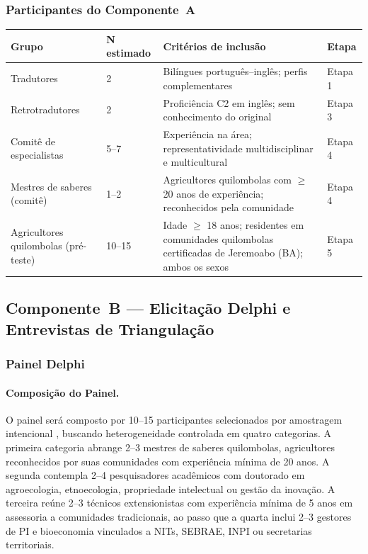 \documentclass[12pt,a4paper,brazil]{article}
\begin{document}
\subsubsection{Participantes do Componente~A}

\begin{longtable}{p{4cm}p{2.5cm}p{5.5cm}p{2cm}}
\toprule
\textbf{Grupo} & \textbf{N estimado} & \textbf{Critérios de inclusão} & \textbf{Etapa} \\
\midrule
\endhead
Tradutores & 2 & Bilíngues português--inglês; perfis complementares & Etapa 1 \\
Retrotradutores & 2 & Proficiência C2 em inglês; sem conhecimento do original & Etapa 3 \\
Comitê de especialistas & 5--7 & Experiência na área; representatividade multidisciplinar e multicultural & Etapa 4 \\
Mestres de saberes (comitê) & 1--2 & Agricultores quilombolas com $\geq$ 20 anos de experiência; reconhecidos pela comunidade & Etapa 4 \\
Agricultores quilombolas (pré-teste) & 10--15 & Idade $\geq$ 18 anos; residentes em comunidades quilombolas certificadas de Jeremoabo (BA); ambos os sexos & Etapa 5 \\
\bottomrule
\end{longtable}


\subsection{Componente~B --- Elicitação Delphi e Entrevistas de Triangulação}

\subsubsection{Painel Delphi}

\paragraph{Composição do Painel.}
O painel será composto por 10--15 participantes selecionados por amostragem intencional \citep{Patton2015}, buscando heterogeneidade controlada em quatro categorias. A primeira categoria abrange 2--3 mestres de saberes quilombolas, agricultores reconhecidos por suas comunidades com experiência mínima de 20 anos. A segunda contempla 2--4 pesquisadores acadêmicos com doutorado em agroecologia, etnoecologia, propriedade intelectual ou gestão da inovação. A terceira reúne 2--3 técnicos extensionistas com experiência mínima de 5 anos em assessoria a comunidades tradicionais, ao passo que a quarta inclui 2--3 gestores de PI e bioeconomia vinculados a NITs, SEBRAE, INPI ou secretarias territoriais.
\end{document}
